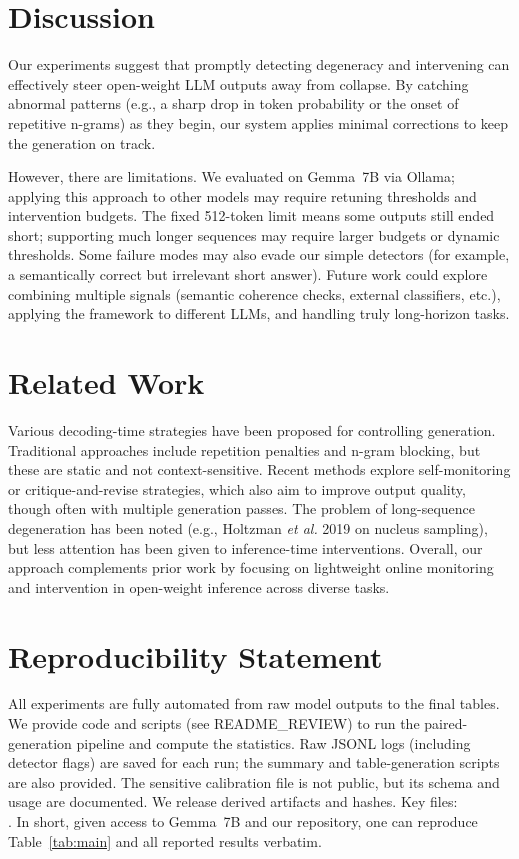 \documentclass{article}
\begin{document}
\section{Discussion}
Our experiments suggest that promptly detecting degeneracy and intervening can effectively steer open-weight LLM outputs away from collapse. By catching abnormal patterns (e.g., a sharp drop in token probability or the onset of repetitive n-grams) as they begin, our system applies minimal corrections to keep the generation on track.

However, there are limitations. We evaluated on Gemma~7B via Ollama; applying this approach to other models may require retuning thresholds and intervention budgets. The fixed 512-token limit means some outputs still ended short; supporting much longer sequences may require larger budgets or dynamic thresholds. Some failure modes may also evade our simple detectors (for example, a semantically correct but irrelevant short answer). Future work could explore combining multiple signals (semantic coherence checks, external classifiers, etc.), applying the framework to different LLMs, and handling truly long-horizon tasks.

\section{Related Work}
Various decoding-time strategies have been proposed for controlling generation. Traditional approaches include repetition penalties and n-gram blocking, but these are static and not context-sensitive. Recent methods explore self-monitoring or critique-and-revise strategies, which also aim to improve output quality, though often with multiple generation passes. The problem of long-sequence degeneration has been noted (e.g., Holtzman \textit{et al.} 2019 on nucleus sampling), but less attention has been given to inference-time interventions. Overall, our approach complements prior work by focusing on lightweight online monitoring and intervention in open-weight inference across diverse tasks.

\section{Reproducibility Statement}
All experiments are fully automated from raw model outputs to the final tables. We provide code and scripts (see README\_REVIEW) to run the paired-generation pipeline and compute the statistics. Raw JSONL logs (including detector flags) are saved for each run; the summary and table-generation scripts are also provided. The sensitive calibration file is not public, but its schema and usage are documented. We release derived artifacts and hashes. Key files:
\\
.
In short, given access to Gemma~7B and our repository, one can reproduce Table~\ref{tab:main} and all reported results verbatim.
\end{document}
